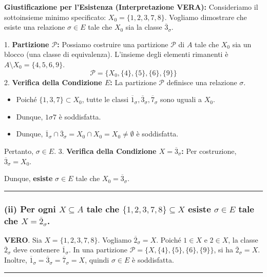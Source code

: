 \textbf{Giustificazione per l'Esistenza (Interpretazione VERA):}
Consideriamo il sottoinsieme minimo specificato: $X_0 = \{1, 2, 3, 7, 8\}$. Vogliamo dimostrare che esiste una relazione $\sigma \in E$ tale che $X_0$ sia la classe $\overline{3}_{\sigma}$.

1.  \textbf{Partizione $\mathcal{P}$:} Possiamo costruire una partizione $\mathcal{P}$ di $A$ tale che $X_0$ sia un blocco (una classe di equivalenza). L'insieme degli elementi rimanenti è $A \setminus X_0 = \{4, 5, 6, 9\}$.
    $$\mathcal{P} = \{ X_0, \{4\}, \{5\}, \{6\}, \{9\} \}$$
2.  \textbf{Verifica della Condizione $E$:} La partizione $\mathcal{P}$ definisce una relazione $\sigma$.
    \begin{itemize}
        \item Poiché $\{1, 3, 7\} \subset X_0$, tutte le classi $\overline{1}_{\sigma}, \overline{3}_{\sigma}, \overline{7}_{\sigma}$ sono uguali a $X_0$.
        \item Dunque, $1 \sigma 7$ è soddisfatta.
        \item Dunque, $\overline{1}_{\sigma} \cap \overline{3}_{\sigma} = X_0 \cap X_0 = X_0 \neq \emptyset$ è soddisfatta.
    \end{itemize}
    Pertanto, $\sigma \in E$.
3.  \textbf{Verifica della Condizione $X = \overline{3}_{\sigma}$:} Per costruzione, $\overline{3}_{\sigma} = X_0$.

Dunque, \textbf{esiste} $\sigma \in E$ tale che $X_0 = \overline{3}_{\sigma}$.

\vspace{0.3cm}
\hrule
\vspace{0.3cm}

\subsubsection*{(ii) Per ogni $X \subseteq A$ tale che $\{1, 2, 3, 7, 8\} \subseteq X$ esiste $\sigma \in E$ tale che $X = \overline{2}_{\sigma}$.}
\textbf{VERO}.
Sia $X = \{1, 2, 3, 7, 8\}$. Vogliamo $\overline{2}_{\sigma} = X$.
Poiché $1 \in X$ e $2 \in X$, la classe $\overline{2}_{\sigma}$ deve contenere $\overline{1}_{\sigma}$.
In una partizione $\mathcal{P} = \{X, \{4\}, \{5\}, \{6\}, \{9\}\}$, si ha $\overline{2}_{\sigma} = X$.
Inoltre, $\overline{1}_{\sigma} = \overline{3}_{\sigma} = \overline{7}_{\sigma} = X$, quindi $\sigma \in E$ è soddisfatta.

\vspace{0.3cm}
\hrule
\vspace{0.3cm}

